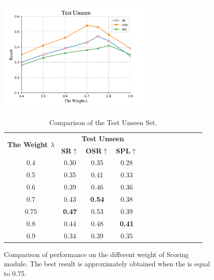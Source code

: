\begin{figure}[t]
	\begin{minipage}{0.5\textwidth}
		\includegraphics[width=3in]{Figure_4.png}
	\end{minipage}
	\hfill
	\begin{minipage}{0.5\textwidth}
		\begin{table}[H]
			\centering
			\caption{Comparison of the Test Unseen Set.}
			{\begin{tabular}[c]{ccccccccccccc}
					\toprule[1pt]
					\multirow{2}{*}{{\textbf{The Weight ${\lambda}$}}} & \multicolumn{4}{c}{{\textbf{Test Unseen}}} \\
					
					& \textbf{SR}$\uparrow$ & \textbf{OSR}$\uparrow$ & \textbf{SPL}$\uparrow$	&  \\
					\toprule[1pt]
					
					0.4   & 0.30 & 0.35 & 0.28 \\
					0.5  & 0.35 &  0.41 & 0.33  \\
					0.6    & 0.39 & 0.46 & 0.36  \\
					0.7 	& 0.43 & \textbf{0.54} & 0.38 \\
					0.75   & \textbf{0.47} &  0.53 & 0.39 \\
					0.8   & 0.44 & 0.48 & \textbf{0.41} \\
					0.9   & 0.34 & 0.39 & 0.35 \\
					\bottomrule[1pt]
				\end{tabular}
				\label{table_3}}
		\end{table}
	\end{minipage}
	\caption{Comparison of performance on the different weight of Scoring module. The best result is approximately obtained when the  is equal to 0.75.}
\end{figure}


